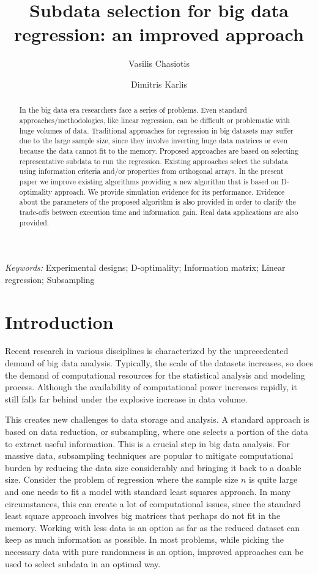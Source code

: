 \documentclass[12pt]{article}
\title{Subdata selection for big data regression: an improved approach}
\author{Vasilis Chasiotis}
\author{Dimitris Karlis}
\affil{\small Department of Statistics, Athens University of Economics and Business,  Greece}
\date{}
\theoremstyle{definition}
\begin{document}
	
	\maketitle
	\thispagestyle{firstpage}
	
	\begin{abstract}
		In the big data era researchers face a series of problems. Even standard approaches/methodologies, like linear regression, can be difficult or problematic with huge volumes of data. Traditional approaches for regression in big datasets may suffer due to the large sample size, since they involve inverting huge data matrices or even because the data cannot fit to the memory. Proposed approaches are based on selecting  representative subdata to run the regression. Existing approaches select the subdata using information criteria and/or properties from orthogonal arrays. 
		In the present paper we improve existing algorithms providing a new algorithm that is based on D-optimality approach. We provide simulation evidence for its performance.
		Evidence about the parameters of the proposed algorithm is also provided in order to clarify the trade-offs between execution time and information gain. Real data applications are also provided.
	\end{abstract}
	
	{\em Keywords:} Experimental designs; D-optimality; Information matrix; Linear regression; Subsampling
	
	\section{Introduction}
	\label{introduction}
	
	
	
	Recent research in various disciplines is characterized by the unprecedented demand of big data analysis. Typically, the scale of the datasets increases, so does the demand of computational resources for the statistical analysis and modeling process. Although the availability of computational power increases rapidly, it still falls far behind under the explosive increase in data volume. 
	
	This creates new challenges to data storage and analysis. A standard approach is based on data reduction, or subsampling, where one selects a portion of the data to extract useful information. This is a crucial step in big data analysis. For massive data, subsampling techniques are popular to mitigate computational burden by reducing the data size considerably and bringing it back to a doable size.
	Consider the problem of regression where the sample size $n$ is quite large and one needs to fit a model with standard least squares approach. In many circumstances, this can create a lot of computational issues, since the standard least square approach involves big matrices that perhaps do not fit in the memory. Working with less data is an option as far as the reduced dataset can keep as much information as possible. In most problems, while picking the necessary data with pure randomness is an option, improved approaches can be used to select subdata in an optimal way. 
	
\end{document}
